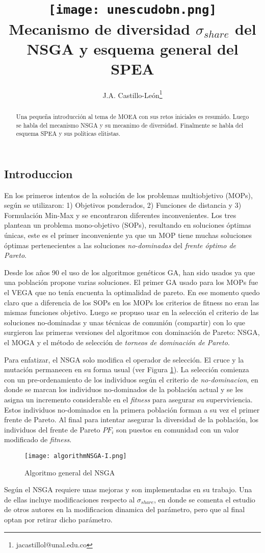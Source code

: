 \documentclass[10pt,onecolumn,twoside,letterpaper]{article}
\title{\vspace{-0.8cm}\texttt{[image: unescudobn.png]}\\\vspace{-0.0cm}
  \LARGE \textbf{Mecanismo de diversidad $\sigma_{share}$ del NSGA y esquema general del SPEA}}
\author{J.A. Castillo-Le\'on\thanks{jacastillol@unal.edu.co}}
\date{}
\begin{document}
\maketitle
\begin{abstract}\small
Una peque\~na introducci\'on al tema de MOEA con sus retos iniciales es resumido. Luego se habla del mecanismo NSGA y su mecanimo de diversidad. Finalmente se habla del esquema SPEA y sus pol\'iticas elitistas.
\end{abstract}
\begin{multicols}{2}
\section{Introduccion}
En los primeros intentos de la soluci\'on de los problemas multiobjetivo (MOPs), seg\'un \cite{CarlosM.Fonseca1993,SrinivasN.1994} se utilizaron: 1) Objetivos ponderados, 2) Funciones de distancia y 3) Formulaci\'on Min-Max y se encontraron diferentes inconvenientes. Los tres plantean un problema mono-objetivo (SOPs), resultando en soluciones \'optimas \'unicas, este es el primer inconveniente ya que un MOP tiene muchas soluciones \'optimas pertenecientes a las soluciones \emph{no-dominadas} del \emph{frente \'optimo de Pareto}. 
\par Desde los a\~nos 90 el uso de los algoritmos gen\'eticos GA, han sido usados ya que una poblaci\'on propone varias soluciones\cite{Zitzler1999}. El primer GA usado para los MOPs fue el VEGA que no ten\'ia encuenta la optimalidad de pareto. En ese momento quedo claro que a diferencia de los SOPs en los MOPs los criterios de fitness no eran las mismas funciones objetivo. Luego se propuso usar en la selecci\'on el criterio de las soluciones no-dominadas y unas t\'ecnicas de comuni\'on (compartir) con lo que surgieron las primeras versiones del algoritmos con dominaci\'on de Pareto: NSGA, el MOGA y el m\'etodo de selecci\'on de \emph{torneos de dominaci\'on de Pareto}.
\par Para enfatizar, el NSGA solo modifica el operador de selecci\'on. El cruce y la mutaci\'on permanecen en su forma usual (ver Figura \ref{fig:NSGAalgorithm}). La selecci\'on comienza con un pre-ordenamiento de los individuos seg\'un el criterio de \emph{no-dominacion}, en donde se marcan los individuos no-dominados de la poblaci\'on actual y se les asigna un incremento considerable en el \emph{fitness} para asegurar su superviviencia. Estos individuos no-dominados en la primera poblaci\'on forman a su vez el primer frente de Pareto. Al final para intentar asegurar la diversidad de la poblaci\'on, los individuos del frente de Pareto $PF_i$ son puestos en comunidad con un valor modificado de \emph{fitness}.
\begin{figure}[H]
  \centering
  \texttt{[image: algorithmNSGA-I.png]}
  \caption{Algoritmo general del NSGA}
  \label{fig:NSGAalgorithm}
\end{figure}
\par Seg\'un \cite{Deb2002} el NSGA requiere unas mejoras y son implementadas en su trabajo. Una de ellas incluye modificaciones respecto al $\sigma_{share}$, en donde se comenta el estudio de otros autores en la modificacion dinamica del par\'ametro, pero que al final optan por retirar dicho par\'ametro.

\end{multicols}
\end{document}
